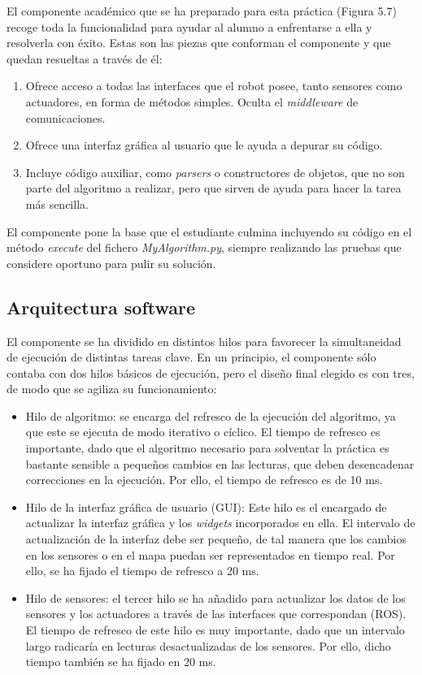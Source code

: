 El componente académico que se ha preparado para esta práctica (Figura 5.7) recoge toda la funcionalidad para ayudar al alumno a enfrentarse a ella y resolverla con éxito. Estas son las piezas que conforman el componente y que quedan resueltas a través de él:  

\begin{enumerate}[label=\alph*)]
	\item Ofrece acceso a todas las interfaces que el robot posee, tanto sensores como actuadores, en forma de métodos simples. Oculta el \textit{middleware} de comunicaciones.
	\item Ofrece una interfaz gráfica al usuario que le ayuda a depurar su código.
	\item Incluye código auxiliar, como \textit{parsers} o constructores de objetos, que no son parte del algoritmo a realizar, pero que sirven de ayuda para hacer la tarea más sencilla.
\end{enumerate}

El componente pone la base que el estudiante culmina incluyendo su código en el método \textit{execute} del fichero \textit{MyAlgorithm.py}, siempre realizando las pruebas que considere oportuno para pulir su solución.

\subsection{Arquitectura software}
El componente se ha dividido en distintos hilos para favorecer la simultaneidad de ejecución de distintas tareas clave. En un principio, el componente sólo contaba con dos hilos básicos de ejecución, pero el diseño final elegido es con tres, de modo que se agiliza su funcionamiento:

\begin{itemize}
  \renewcommand{\labelitemi}{$\to$}
	\item Hilo de algoritmo: se encarga del refresco de la ejecución del algoritmo, ya que este se ejecuta de modo iterativo o cíclico. El tiempo de refresco es importante, dado que el algoritmo necesario para solventar la práctica es bastante sensible a pequeños cambios en las lecturas, que deben desencadenar correcciones en la ejecución. Por ello, el tiempo de refresco es de 10 ms.
	\item Hilo de la interfaz gráfica de usuario (GUI): Este hilo es el encargado de actualizar la interfaz gráfica y los \textit{widgets} incorporados en ella. El intervalo de actualización de la interfaz debe ser pequeño, de tal manera que los cambios en los sensores o en el mapa puedan ser representados en tiempo real. Por ello, se ha fijado el tiempo de refresco a 20 ms.
	\item Hilo de sensores: el tercer hilo se ha añadido para actualizar los datos de los sensores y los actuadores a través de las interfaces que correspondan (ROS). El tiempo de refresco de este hilo es muy importante, dado que un intervalo largo radicaría en lecturas desactualizadas de los sensores. Por ello, dicho tiempo también se ha fijado en 20 ms.
\end{itemize}

